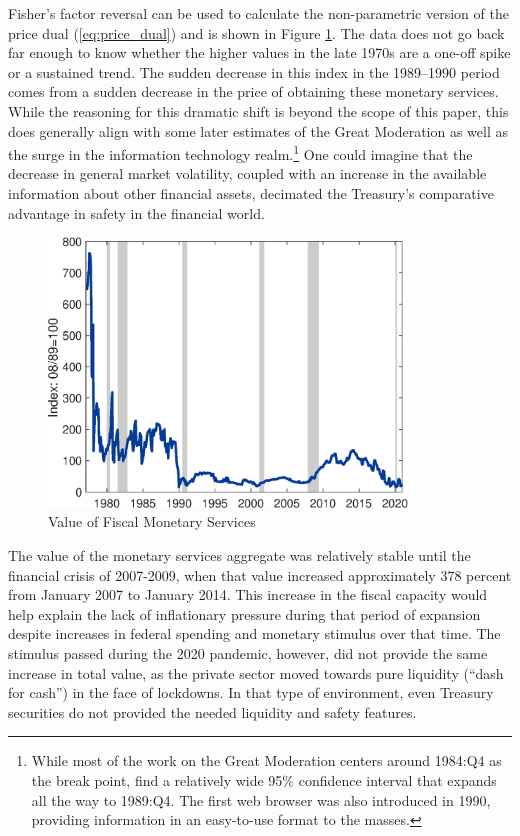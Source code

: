 \documentclass[11pt,a4paper,margin=1.5in]{article}
\begin{document}
Fisher's factor reversal can be used to calculate the non-parametric version of the price dual (\ref{eq:price_dual}) and is shown in Figure \ref{fig:FiscalServices_Value}.
The data does not go back far enough to know whether the higher values in the late 1970s are a one-off spike or a sustained trend. 
The sudden decrease in this index in the 1989--1990 period comes from a sudden decrease in the price of obtaining these monetary services.
While the reasoning for this dramatic shift is beyond the scope of this paper, this does generally align with some later estimates of the Great Moderation as well as the surge in the information technology realm.\footnote{
	While most of the work on the Great Moderation centers around 1984:Q4 as the break point, \citet{Stock-Watson:2002} find a relatively wide 95\% confidence interval that expands all the way to 1989:Q4.
	The first web browser was also introduced in 1990, providing information in an easy-to-use format to the masses.}
One could imagine that the decrease in general market volatility, coupled with an increase in the available information about other financial assets, decimated the Treasury's comparative advantage in safety in the financial world.
\begin{figure}[h!]
\centering
\includegraphics[width=0.85\textwidth]{../Figures/FiscalCapacity_Index.eps}
\caption{Value of Fiscal Monetary Services}
\label{fig:FiscalServices_Value}
\end{figure}

The value of the monetary services aggregate was relatively stable until the financial crisis of 2007-2009, when that value increased approximately 378 percent from January 2007 to January 2014. 
This increase in the fiscal capacity would help explain the lack of inflationary pressure during that period of expansion despite increases in federal spending and monetary stimulus over that time.
The stimulus passed during the 2020 pandemic, however, did not provide the same increase in total value, as the private sector moved towards pure liquidity (``dash for cash'') in the face of lockdowns.
In that type of environment, even Treasury securities do not provided the needed liquidity and safety features.
\end{document}
